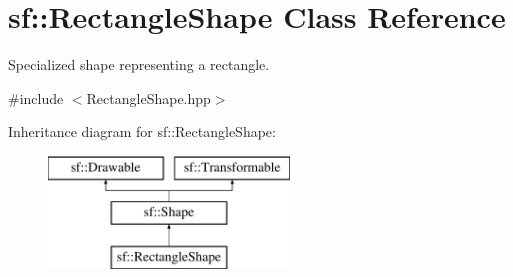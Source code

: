 \hypertarget{classsf_1_1_rectangle_shape}{}\section{sf\+:\+:Rectangle\+Shape Class Reference}
\label{classsf_1_1_rectangle_shape}


Specialized shape representing a rectangle.  




{\ttfamily \#include $<$Rectangle\+Shape.\+hpp$>$}

Inheritance diagram for sf\+:\+:Rectangle\+Shape\+:\begin{figure}[H]
\begin{center}
\leavevmode
\includegraphics[height=3.000000cm]{classsf_1_1_rectangle_shape}
\end{center}
\end{figure}
